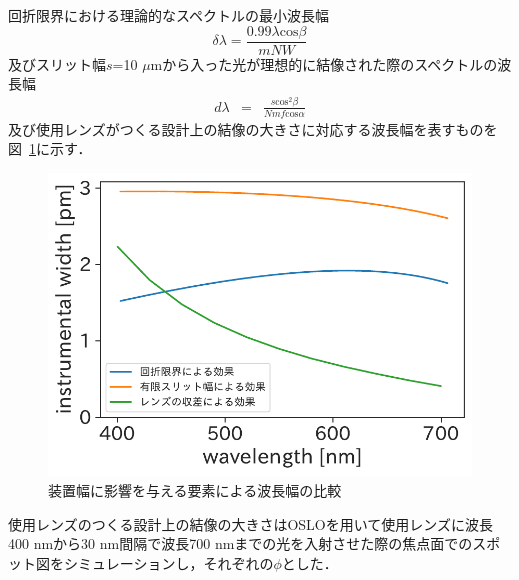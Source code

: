 回折限界における理論的なスペクトルの最小波長幅
\begin{equation}
     \delta\lambda = \frac{0.99 \lambda \mathrm{cos}{\beta} }{mNW}
\end{equation}
及びスリット幅$s$=10 $\mu$mから入った光が理想的に結像された際のスペクトルの波長幅
\begin{eqnarray}
     d\lambda &=& 
        \frac{s\mathrm{cos}^2{\beta}}{Nmf\mathrm{cos}{\alpha}}
\end{eqnarray}
及び使用レンズがつくる設計上の結像の大きさに対応する波長幅を表すものを図\ \ref{fig:instrumental_function_design}に示す．
\begin{figure}[htbp]
    \centering
    \includegraphics[scale=0.7]{figure/instrumental_function_design.pdf}
    \caption{装置幅に影響を与える要素による波長幅の比較}
    \label{fig:instrumental_function_design}
\end{figure}
使用レンズのつくる設計上の結像の大きさはOSLOを用いて使用レンズに波長400 nmから30 nm間隔で波長700 nmまでの光を入射させた際の焦点面でのスポット図をシミュレーションし，それぞれの$\phi$とした．


